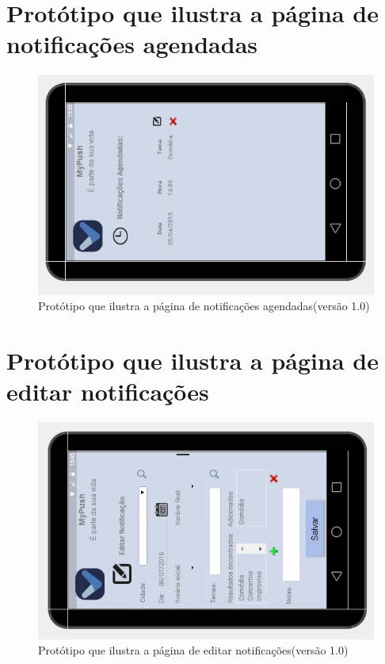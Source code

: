 \begin{apendicesenv}
      \section*{Protótipo que ilustra a página de notificações agendadas}

    \begin{figure}[!htbp]
      \centering
      \includegraphics[scale=0.5, angle=-90]{editaveis/figuras/prototipo_alta_fidelidade_v1/1_7}
      \caption{Protótipo que ilustra a página de notificações agendadas(versão 1.0)}
      \label{v1}
    \end{figure}
    
      \section*{Protótipo que ilustra a página de editar notificações}

    \begin{figure}[!htbp]
      \centering
      \includegraphics[scale=0.5, angle=-90]{editaveis/figuras/prototipo_alta_fidelidade_v1/1_8}
      \caption{Protótipo que ilustra a página de editar notificações(versão 1.0)}
      \label{v1}
    \end{figure}
    

\end{apendicesenv}
